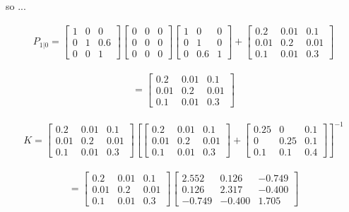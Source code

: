 so ...

\[\begin{aligned}
P_{1|0} = \begin{bmatrix} 1 & 0  &
0  \\
0 & 1  &
0.6  \\
0 & 0  & 1  \end{bmatrix}
\begin{bmatrix} 0 & 0 & 0\\ 0 & 0 & 0 \\ 0 & 0 & 0 \end{bmatrix}
\begin{bmatrix} 1 & 0  &
0  \\
0 & 1  &
0 \\
0 & 0.6  & 1  \end{bmatrix}
+
\begin{bmatrix} 0.2 & 0.01 & 0.1 \\ 0.01 & 0.2 & 0.01  \\ 0.1 & 0.01 & 0.3 \end{bmatrix}
\end{aligned}\]

\[\begin{aligned}
=  \begin{bmatrix} 0.2 & 0.01 & 0.1 \\ 0.01 & 0.2 & 0.01  \\ 0.1 & 0.01 & 0.3 \end{bmatrix}
\end{aligned}\]

\[\begin{aligned}
K = \begin{bmatrix} 0.2 & 0.01 & 0.1 \\ 0.01 & 0.2 & 0.01  \\ 0.1 & 0.01 & 0.3 \end{bmatrix}
\left[ \begin{bmatrix} 0.2 & 0.01 & 0.1 \\ 0.01 & 0.2 & 0.01  \\ 0.1 & 0.01 & 0.3 \end{bmatrix} +
\begin{bmatrix} 0.25 & 0 & 0.1 \\ 0 & 0.25 & 0.1  \\ 0.1 & 0.1 & 0.4 \end{bmatrix}
\right]^{-1}
\end{aligned}\]

\[\begin{aligned}
= \begin{bmatrix} 0.2 & 0.01 & 0.1 \\ 0.01 & 0.2 & 0.01  \\ 0.1 & 0.01 & 0.3 \end{bmatrix}
\begin{bmatrix}  2.552 & 0.126 & -0.749 \\
 0.126 & 2.317 & -0.400 \\
-0.749& -0.400 & 1.705
\end{bmatrix}
\end{aligned}\]

